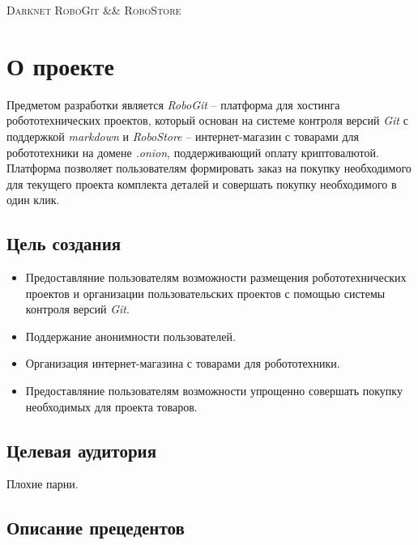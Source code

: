 \documentclass[12pt, a4paper]{article}
\begin{document}


\begin{center}
\textsc{Darknet RoboGit \&\& RoboStore}
\vspace{12mm}
\end{center}
\tableofcontents
\newpage


\section{О проекте}

Предметом разработки является \textit{RoboGit} -- платформа для хостинга 
робототехнических проектов, который основан на системе контроля версий
\textit{Git} с поддержкой \textit{markdown} и \textit{RoboStore} -- интернет-магазин
с товарами для робототехники на домене \textit{.onion}, поддерживающий
оплату криптовалютой.
Платформа позволяет пользователям формировать заказ на покупку
необходимого для текущего проекта комплекта деталей и совершать покупку
необходимого в один клик.

\subsection{Цель создания}

\begin{itemize}
\item Предоставляние пользователям возможности размещения 
  робототехнических проектов и организации пользовательских проектов
  с помощью системы контроля версий \textit{Git}.
\item Поддержание анонимности пользователей.
\item Организация интернет-магазина с товарами для робототехники.
\item Предоставляние пользователям возможности упрощенно совершать покупку
  необходимых для проекта товаров.
\end{itemize}

\subsection{Целевая аудитория}

Плохие парни.

\subsection{Описание прецедентов}
\end{document}
